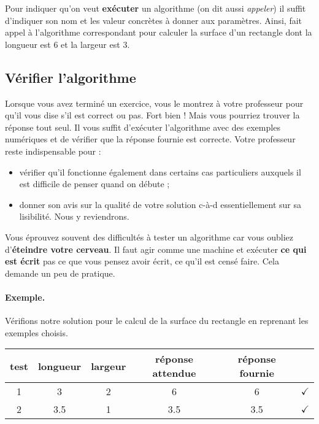 			Pour indiquer qu'on veut \textbf{exécuter} un algorithme
			(on dit aussi \emph{appeler})
			il suffit d'indiquer son nom 
			et les valeur concrètes à donner aux paramètres.
			Ainsi, 
			fait appel à l'algorithme correspondant
			pour calculer la surface d'un rectangle
			dont la longueur est $6$
			et la largeur est $3$.

		\subsection{Vérifier l'algorithme}
		
			Lorsque vous avez terminé un exercice,
			vous le montrez à votre professeur pour qu'il
			vous dise s'il est correct ou pas.
			Fort bien !
			Mais vous pourriez trouver la réponse tout seul.
			Il vous suffit d'exécuter l'algorithme
			avec des exemples numériques et de vérifier que la réponse
			fournie est correcte.
			Votre professeur reste indispensable pour :
			\begin{itemize}
			\item
				vérifier qu'il fonctionne également
				dans certains cas particuliers
				auxquels il est difficile de penser quand on débute ;
			\item
				donner son avis sur la qualité de votre solution
				c-à-d essentiellement sur sa lisibilité.
				Nous y reviendrons.
			\end{itemize}
		
			Vous éprouvez souvent des difficultés à tester un algorithme
			car vous oubliez d'\textbf{éteindre votre cerveau}.
			Il faut agir comme une machine
			et exécuter \textbf{ce qui est écrit} 
			pas ce que vous pensez avoir écrit,
			ce qu'il est censé faire.
			Cela demande un peu de pratique.

			\paragraph{Exemple.} 
			Vérifions notre solution 
			pour le calcul de la surface du rectangle
			en reprenant les exemples choisis.
			
			\begin{center}
			\begin{tabular}{|c|cccc|c|}
			\hline
			test \no & longueur & largeur & réponse attendue & réponse fournie & {} \\\hline
			\hline 
			1 & 3   & 2 & 6   & 6   & {\color{ForestGreen}$\checkmark$} \\\hline
			2 & 3.5 & 1 & 3.5 & 3.5 & {\color{ForestGreen}$\checkmark$} \\\hline
			\end{tabular}
			\end{center}				
			
